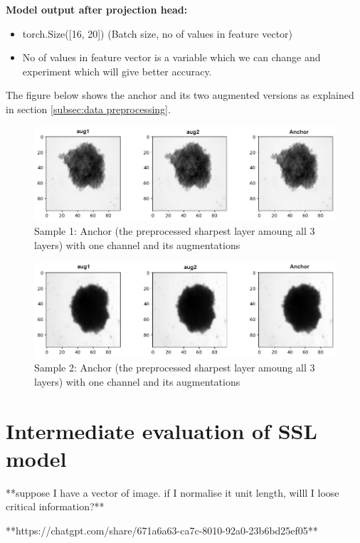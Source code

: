 \documentclass[12pt,twoside,a4paper,parskip]{scrbook} %
\begin{document}
\textbf{Model output after projection head:}
\begin{itemize}
  \item torch.Size([16, 20])  (Batch size, no of values in feature vector)  
  \item No of values in feature vector is a variable which we can change and experiment which will give better accuracy.
\end{itemize}

The figure below shows the anchor and its two augmented versions as explained in section \ref{subsec:data preprocessing}.
\begin{figure}[H]
  \centering
  \includegraphics[width=0.9\linewidth]{figures/1_1.png} %
  \caption{Sample 1: Anchor (the preprocessed sharpest layer amoung all 3 layers) with one channel and its augmentations}
  \label{fig:1doutput1}
\end{figure}

\begin{figure}[H]
  \centering
  \includegraphics[width=0.9\linewidth]{figures/1_2.png} %
  \caption{Sample 2: Anchor (the preprocessed sharpest layer amoung all 3 layers) with one channel and its augmentations}
  \label{fig:1doutput3}
\end{figure}

\section{Intermediate evaluation of SSL model}
**suppose I have a vector of image. if I normalise it unit length, willl I loose critical information?**

**https://chatgpt.com/share/671a6a63-ca7c-8010-92a0-23b6bd25ef05**
\end{document}
